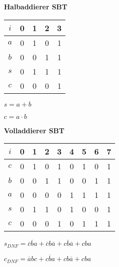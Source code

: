 \begin{minipage}[t]{0.5\textwidth} \vspace{0mm} \centering
	\textbf{Halbaddierer SBT}
	
	\begin{tabular}{c*{4}{c}}
		$i$ & 0 & 1 & 2 & 3 \\ \hline
		$a$ & 0 & 1 & 0 & 1 \\
		$b$ & 0 & 0 & 1 & 1 \\ \hline
		$s$ & 0 & 1 & 1 & 1 \\ \hline
		$c$ & 0 & 0 & 0 & 1 \\
	\end{tabular}
	
	$s = a + b$
	
	$c = a \cdot b $
\end{minipage}
\begin{minipage}[t]{0.5\textwidth} \vspace{0mm} \centering
	\textbf{Volladdierer SBT}
	
	\begin{tabular}{c*{8}{c}}
		$i$ & 0 & 1 & 2 & 3 & 4 & 5 & 6 & 7 \\ \hline
		$c$ & 0 & 1 & 0 & 1 & 0 & 1 & 0 & 1 \\
		$b$ & 0 & 0 & 1 & 1 & 0 & 0 & 1 & 1 \\
		$a$ & 0 & 0 & 0 & 0 & 1 & 1 & 1 & 1 \\ \hline
		$s$ & 0 & 1 & 1 & 0 & 1 & 0 & 0 & 1 \\ \hline
		$c$ & 0 & 0 & 0 & 1 & 0 & 1 & 1 & 1 \\
	\end{tabular}
	
	$s_{\textit{DNF}} = \overline{c}\overline{b}a
		+ \overline{c}b\overline{a} 
		+ c\overline{b}\overline{a}
		+ cba$
	
	$c_{\textit{DNF}} = \overline{a}bc
		+ c\overline{b}a 
		+ cb\overline{a}
		+ cba$
\end{minipage}



%



